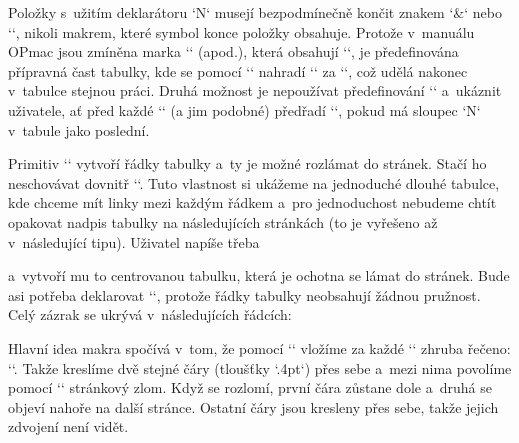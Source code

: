 Položky s~užitím deklarátoru `N` musejí bezpodmínečně končit znakem `&` nebo `\cr`, nikoli makrem, které symbol konce položky obsahuje. Protože v~manuálu OPmac jsou zmíněna marka `\crl` (apod.), která obsahují `\cr`, je předefinována přípravná čast tabulky, kde se pomocí `\replacestrings` nahradí `\crl` za `\crcr\crl`, což udělá nakonec v~tabulce stejnou práci. Druhá možnost je nepoužívat předefinování `\tableA` a~ukáznit uživatele, ať před každé `\crl` (a jim podobné) předřadí `\cr`, pokud má sloupec `N` v~tabule jako poslední. 


 


Primitiv `\halign` vytvoří řádky tabulky a~ty je možné rozlámat do stránek. Stačí ho neschovávat dovnitř `\vboxu`. Tuto vlastnost si ukážeme na jednoduché dlouhé tabulce, kde chceme mít linky mezi každým řádkem a~pro jednoduchost nebudeme chtít opakovat nadpis tabulky na následujících stránkách (to je vyřešeno až v~následující tipu). Uživatel napíše třeba 

\begtt
{} 
\endtt


a~vytvoří mu to centrovanou tabulku, která je ochotna se lámat do stránek. Bude asi potřeba deklarovat `\raggedbottom`, protože řádky tabulky neobsahují žádnou pružnost. Celý zázrak se ukrývá v~následujících řádcích: 

\begtt
\def\longtable{\goodbreak \bgroup \catcode`\|=12 \tableL} 
\def\tableL#1#2{\setbox0=\table{#1}{#2}\setbox0=\hbox to\wd0{} %
   \tmpdim=\hsize \advance\tmpdim by-\wd0 \divide\tmpdim by2   %
   \def\tabstrut{\vrule height1.1em depth.5em width0pt }       %
   \everycr={\longtablecr}\offinterlineskip                    %
   \def\tmpa{}\tabdata={\kern\tmpdim}\scantabdata#1\relax      %
   \halign\expandafter{\the\tabdata\tabstrutA\cr#2\crcr}\egroup\goodbreak} 
\def\longtablecr{\noalign{\nobreak\ltrule\penalty0\kern-.4pt\ltrule\nobreak}} 
\def\ltrule{\moveright\tmpdim\hbox to\wd0{\hrulefill}} 
\endtt


Hlavní idea makra spočívá v~tom, že pomocí `\everycr` vložíme za každé `\cr` zhruba řečeno: ``. Takže kreslíme dvě stejné čáry (tloušťky `.4pt`) přes sebe a~mezi nima povolíme pomocí `` stránkový zlom. Když se rozlomí, první čára zůstane dole a~druhá se objeví nahoře na další stránce. Ostatní čáry jsou kresleny přes sebe, takže jejich zdvojení není vidět. 



